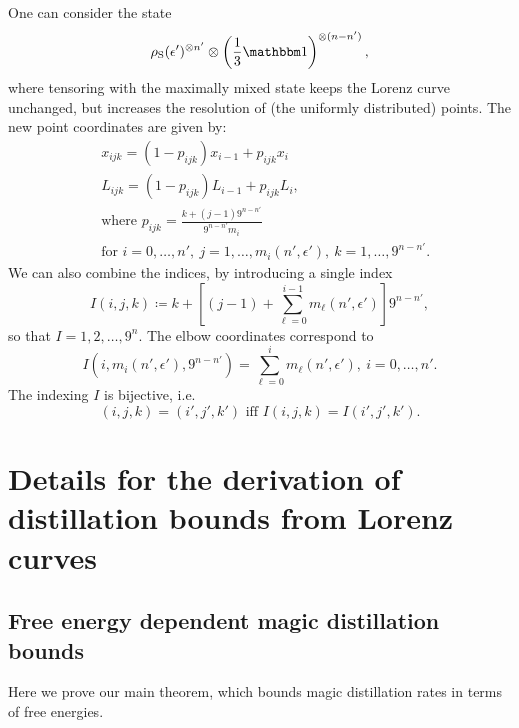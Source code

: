 \documentclass[pra,
aps,
twocolumn,
superscriptaddress,
groupedaddress,
nofootinbib,
reprint
]{revtex4-1}
\begin{document}
One can consider the state 
\begin{equation*}
\rho_{\rm{S}}(\epsilon')^{\otimes n'} \otimes \left( \frac{1}{3}\id \right)^{\otimes (n-n')},
\end{equation*}
where tensoring with the maximally mixed state keeps the Lorenz curve unchanged, but increases the resolution of (the uniformly distributed) points.
The new point coordinates are given by:
\begin{align}
    &x_{ijk} = \left( 1-p_{ijk}\right) x_{i-1} + p_{ijk} x_{i} \label{eq:lcsu_xcoord}\\
    &L_{ijk} = \left( 1-p_{ijk} \right) L_{i-1} + p_{ijk} L_{i}, \label{eq:lcsu_lcoord}\\
    &\text{where } p_{ijk} = \frac{k + (j-1)9^{n-n'}}{9^{n-n'} m_{i}} \nonumber\\
    &\text{for } i=0,\dots,n',\ j = 1,\dots,m_{i}(n', \epsilon'),\ k = 1,\dots,9^{n-n'}. \nonumber
\end{align}
We can also combine the indices, by introducing a single index
\begin{equation}
    I(i,j,k) \coloneqq k + \left[ (j-1) + \sum_{\ell=0}^{i-1} m_{\ell}(n', \epsilon') \right]9^{n-n'},
\end{equation}
so that $I=1,2,\dots, 9^{n}$.
The elbow coordinates correspond to 
\begin{equation}
	I(i, m_{i}(n', \epsilon'), 9^{n-n'}) = \sum_{\ell=0}^{i} m_{\ell}(n', \epsilon'),\ i= 0,\dots,n'.
\end{equation}
The indexing $I$ is bijective, i.e.
\begin{equation}
	(i,j,k) = (i',j',k') \text{ iff } I(i,j,k) = I(i',j',k').
\end{equation}


\section{Details for the derivation of distillation bounds from Lorenz curves}
\label{app:lcst_technical}

\subsection{Free energy dependent magic distillation bounds}\label{free-energy-bound-proof}
\label{app:main_proof}
Here we prove our main theorem, which bounds magic distillation rates in terms of free energies.
\end{document}
